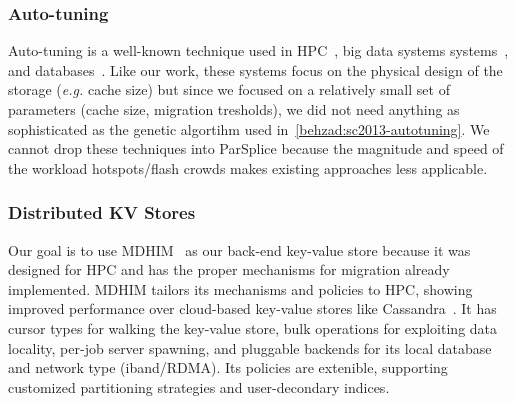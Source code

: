 \subsubsection*{Auto-tuning} Auto-tuning is a well-known technique used in
HPC~\cite{behzad:sc2013-autotuning, behzad:techreport2014-io-autotuning}, big
data systems systems~\cite{herodotou_starfish_2011}, and
databases~\cite{schnaitter_index_2009}.  Like our work, these systems focus on
the physical design of the storage ({\it e.g.} cache size) but since we focused
on a relatively small set of parameters (cache size, migration tresholds), we
did not need anything as sophisticated as the genetic algortihm used
in~\ref{behzad:sc2013-autotuning}.  We cannot drop these techniques into
ParSplice because the magnitude and speed of the workload hotspots/flash crowds
makes existing approaches less applicable. 

\subsubsection*{Distributed KV Stores}

Our goal is to use MDHIM~\cite{greenberg:hotstorage2015-mdhim} as our back-end
key-value store because it was designed for HPC and has the proper mechanisms
for migration already implemented.  MDHIM tailors its mechanisms and policies
to HPC, showing improved performance over cloud-based key-value stores like
Cassandra~\cite{lakshman_cassandra_2010}. It has cursor types for walking the
key-value store, bulk operations for exploiting data locality, per-job server
spawning, and pluggable backends for its local database and network type
(iband/RDMA). Its policies are extenible, supporting customized partitioning
strategies and user-decondary indices.
